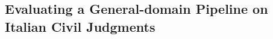 





\subsection{Evaluating a General-domain Pipeline on Italian Civil Judgments}
\label{sec:judgment_ee_eval}

